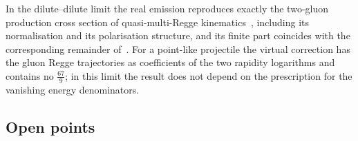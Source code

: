 In the dilute--dilute limit the real emission reproduces exactly the two-gluon production cross section of quasi-multi-Regge kinematics~\cite{Fadin:1998py,Bartels:2006hg}, including its normalisation and its polarisation structure, and its finite part coincides with the corresponding remainder of~\cite{Bartels:2006hg}. For a point-like projectile the virtual correction has the gluon Regge trajectories as coefficients of the two rapidity logarithms and contains no $\frac{67}{9}$; in this limit the result does not depend on the prescription for the vanishing energy denominators.

\subsection{Open points}\label{sec:openpoints}


